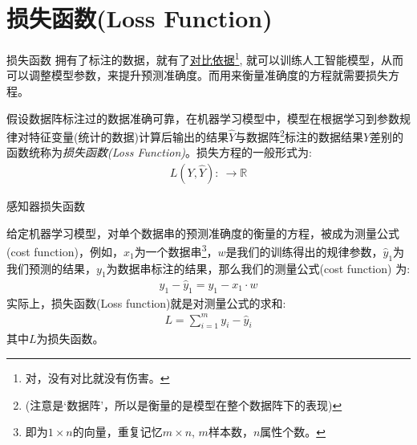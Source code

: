 \documentclass[handout]{ctexbeamer}
\newcommand{\rn}{\mathbb{R}}
\begin{document}
\section{损失函数(Loss Function)}

\begin{frame}{损失函数}
拥有了标注的数据，就有了\underline{对比依据}\footnote[frame]{对，没有对比就没有伤害。}, 就可以训练人工智能模型，从而可以调整模型参数，来提升预测准确度。而用来衡量准确度的方程就需要损失方程。

\hfil

\begin{definition}
	假设数据阵标注过的数据准确可靠，在机器学习模型中，模型在根据学习到参数规律对特征变量(统计的数据)计算后输出的结果$\hat{Y}$与数据阵\footnote{(注意是`数据阵'，所以是衡量的是模型在整个数据阵下的表现)}标注的数据结果$Y$差别的函数统称为\textit{损失函数(Loss Function)}。损失方程的一般形式为:
\begin{align*}
	L(Y, \hat{Y}): \ \to \rn 
\end{align*}	
\end{definition}
\end{frame}

\begin{frame}{感知器损失函数}
\begin{definition}
	给定机器学习模型，对单个数据串的预测准确度的衡量的方程，被成为测量公式(cost function)，例如，$x_1$为一个数据串\footnote{即为$1 \times n$的向量，重复记忆$m \times n$, $m$样本数，$n$属性个数。}，$w$是我们的训练得出的规律参数，$\hat{y}_1$为我们预测的结果，$y_1$为数据串标注的结果，那么我们的测量公式(cost function) 为:
	\begin{align*}
		y_1 - \hat{y}_1 = y_1 - x_1 \cdot w 
	\end{align*}
	实际上，损失函数(Loss function)就是对测量公式的求和:
	\begin{align*}
		L = \sum_{i=1}^m y_i - \hat{y}_i 
	\end{align*}
	其中$L$为损失函数。
\end{definition}
\end{frame}
\end{document}
